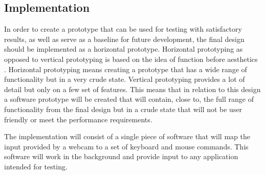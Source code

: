 \subsection{Implementation}
In order to create a prototype that can be used for testing with satisfactory results, as well as serve as a baseline for future development, the final design should be implemented as a horizontal prototype. Horizontal prototyping as opposed to vertical prototyping is based on the idea of function before aesthetics \parencite{Rogers2002}. Horizontal prototyping means creating a prototype that has a wide range of functionality but in a very crude state. Vertical prototyping provides a lot of detail but only on a few set of features. This means that in relation to this design a software prototype will be created that will contain, close to, the full range of functionality from the final design but in a crude state that will not be user friendly or meet the performance requirements. 

The implementation will consist of a single piece of software that will map the input provided by a webcam to a set of keyboard and mouse commands. This software will work in the background and provide input to any application intended for testing.
